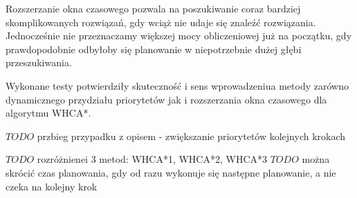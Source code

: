 Rozszerzanie okna czasowego pozwala na poszukiwanie coraz bardziej skomplikowanych rozwiązań, gdy wciąż nie udaje się znaleźć rozwiązania. Jednocześnie nie przeznaczamy większej mocy obliczeniowej już na początku, gdy prawdopodobnie odbyłoby się planowanie w niepotrzebnie dużej głębi przeszukiwania.

Wykonane testy potwierdziły skuteczność i sens wprowadzeniua metody zarówno dynamicznego przydziału priorytetów jak i rozszerzania okna czasowego dla algorytmu WHCA*.

$TODO$
przbieg przypadku z opisem - zwiększanie priorytetów kolejnych krokach

$TODO$ rozróżnienei 3 metod: WHCA*1, WHCA*2, WHCA*3
$TODO$ można skrócić czas planowania, gdy od razu wykonuje się następne planowanie, a nie czeka na kolejny krok